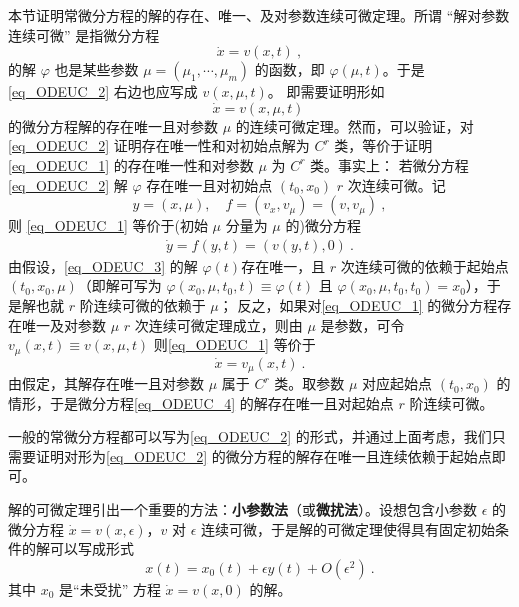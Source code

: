 
本节证明常微分方程的解的存在、唯一、及对参数连续可微定理。所谓 “解对参数连续可微” 是指微分方程
\begin{equation}\label{eq_ODEUC_2}
\dot x=v(x,t)~,
\end{equation}
 的解 $\varphi$ 也是某些参数 $\mu=(\mu_1,\cdots,\mu_m)$ 的函数，即 $\varphi(\mu,t)$。于是 \autoref{eq_ODEUC_2} 右边也应写成 $v(x,\mu,t)$。 即需要证明形如
\begin{equation}\label{eq_ODEUC_1}
\dot x=v(x,\mu,t)~
\end{equation}
的微分方程解的存在唯一且对参数 $\mu$ 的连续可微定理。然而，可以验证，对\autoref{eq_ODEUC_2} 证明存在唯一性和对初始点解为 $C^r$ 类，等价于证明\autoref{eq_ODEUC_1} 的存在唯一性和对参数 $\mu$ 为 $C^r$ 类。事实上：
若微分方程\autoref{eq_ODEUC_2} 解 $\varphi$ 存在唯一且对初始点 $(t_0,x_0)$ $r$ 次连续可微。记 
\begin{equation}
y=(x,\mu),\quad f=(v_x,v_{\mu})=(v,v_{\mu})~,
\end{equation}
则 \autoref{eq_ODEUC_1} 等价于(初始 $\mu$ 分量为 $\mu$ 的)微分方程
\begin{equation}\label{eq_ODEUC_3}
\begin{aligned}
\dot y=f(y,t)=(v(y,t),0)~.
\end{aligned}
\end{equation}
由假设，\autoref{eq_ODEUC_3} 的解 $\varphi(t)$存在唯一，且 $r$ 次连续可微的依赖于起始点 $(t_0,x_0,\mu)$（即解可写为 $\varphi(x_0,\mu,t_0,t)\equiv\varphi(t)$ 且 $\varphi(x_0,\mu,t_0,t_0)=x_0$），于是解也就 $r$ 阶连续可微的依赖于 $\mu$；
反之，如果对\autoref{eq_ODEUC_1} 的微分方程存在唯一及对参数 $\mu$ $r$ 次连续可微定理成立，则由 $\mu$ 是参数，可令 $v_\mu(x,t)\equiv v(x,\mu,t)$ 则\autoref{eq_ODEUC_1} 等价于
\begin{equation}\label{eq_ODEUC_4} 
\dot x=v_{\mu}(x,t)~.
\end{equation}
由假定，其解存在唯一且对参数 $\mu$ 属于 $C^r$ 类。取参数 $\mu$ 对应起始点 $(t_0,x_0)$ 的情形，于是微分方程\autoref{eq_ODEUC_4} 的解存在唯一且对起始点 $r$ 阶连续可微。

一般的常微分方程都可以写为\autoref{eq_ODEUC_2} 的形式，并通过上面考虑，我们只需要证明对形为\autoref{eq_ODEUC_2} 的微分方程的解存在唯一且连续依赖于起始点即可。

解的可微定理引出一个重要的方法：\textbf{小参数法}（或\textbf{微扰法}）。设想包含小参数 $\epsilon$ 的微分方程 $\dot x=v(x,\epsilon)$，$v$ 对 $\epsilon$ 连续可微，于是解的可微定理使得具有固定初始条件的解可以写成形式
\begin{equation}
x(t)=x_0(t)+\epsilon y(t)+O(\epsilon^2)~.
\end{equation}
其中 $x_0$ 是“未受扰” 方程 $\dot x=v(x,0)$ 的解。

